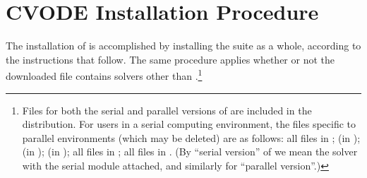 \chapter{CVODE Installation Procedure}\label{c:install}

The installation of {\cvode} is accomplished by installing the
{\sundials} suite as a whole, according to the instructions that
follow. The same procedure applies whether or not the downloaded
file contains solvers other than {\cvode}.\footnote{Files for both the
serial and parallel versions of {\cvode} are included in the distribution.
For users in a serial computing environment, the files specific to parallel
environments (which may be deleted) are as follows:
all files in ;
 (in );
 (in ); 
 (in );
all files in ;
all files in .
(By ``serial version'' of {\cvode} we mean the {\cvode} solver with the
serial {\nvector} module attached, and similarly for ``parallel version''.)}




